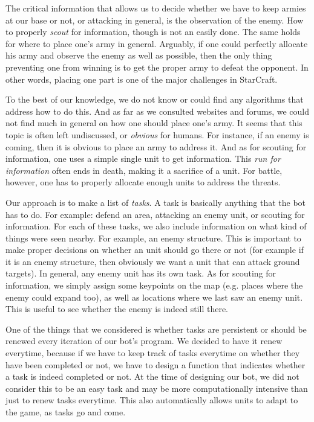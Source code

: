 The critical information that allows us to decide whether we have to keep armies at our base or not, or attacking in general, is the observation of the enemy. How to properly \emph{scout} for information, though is not an easily done. The same holds for where to place one's army in general. Arguably, if one could perfectly allocate his army and observe the enemy as well as possible, then the only thing preventing one from winning is to get the proper army to defeat the opponent. In other words, placing one part is one of the major challenges in StarCraft.

To the best of our knowledge, we do not know or could find any algorithms that address how to do this. And as far as we consulted websites and forums, we could not find much in general on how one should place one's army. It seems that this topic is often left undiscussed, or \emph{obvious} for humans. For instance, if an enemy is coming, then it is obvious to place an army to address it. And as for scouting for information, one uses a simple single unit to get information. This \emph{run for information} often ends in death, making it a sacrifice of a unit. For battle, however, one has to properly allocate enough units to address the threats.

Our approach is to make a list of \emph{tasks}. A task is basically anything that the bot has to do. For example: defend an area, attacking an enemy unit, or scouting for information. For each of these tasks, we also include information on what kind of things were seen nearby. For example, an enemy structure. This is important to make proper decisions on whether an unit should go there or not (for example if it is an enemy structure, then obviously we want a unit that can attack ground targets). In general, any enemy unit has its own task. As for scouting for information, we simply assign some keypoints on the map (e.g. places where the enemy could expand too), as well as locations where we last saw an enemy unit. This is useful to see whether the enemy is indeed still there.

One of the things that we considered is whether tasks are persistent or should be renewed every iteration of our bot's program. We decided to have it renew everytime, because if we have to keep track of tasks everytime on whether they have been completed or not, we have to design a function that indicates whether a task is indeed completed or not. At the time of designing our bot, we did not consider this to be an easy task and may be more computationally intensive than just to renew tasks everytime. This also automatically allows units to adapt to the game, as tasks go and come.

